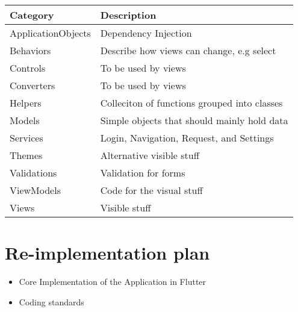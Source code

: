 \begin{longtable}[]{@{}ll@{}}
\toprule
Category & Description\tabularnewline
\midrule
\endhead
ApplicationObjects & Dependency Injection\tabularnewline
Behaviors & Describe how views can change, e.g select\tabularnewline
Controls & To be used by views\tabularnewline
Converters & To be used by views\tabularnewline
Helpers & Colleciton of functions grouped into classes\tabularnewline
Models & Simple objects that should mainly hold data\tabularnewline
Services & Login, Navigation, Request, and Settings\tabularnewline
Themes & Alternative visible stuff\tabularnewline
Validations & Validation for forms\tabularnewline
ViewModels & Code for the visual stuff\tabularnewline
Views & Visible stuff\tabularnewline
\bottomrule
\end{longtable}

\section{Re-implementation plan}

\begin{itemize}
    \item Core Implementation of the Application in Flutter
    \item Coding standards
\end{itemize}
